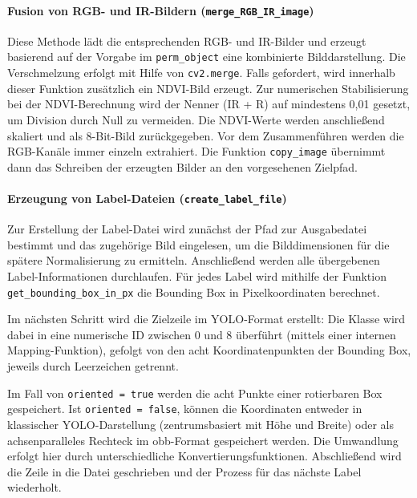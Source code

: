 \paragraph{Fusion von RGB- und IR-Bildern (\texttt{merge\_RGB\_IR\_image})}

Diese Methode lädt die entsprechenden \acrshort{RGB}- und \acrshort{IR}-Bilder und erzeugt basierend auf der Vorgabe im \texttt{perm\_object} eine kombinierte Bilddarstellung. Die Verschmelzung erfolgt mit Hilfe von \texttt{cv2.merge}. Falls gefordert, wird innerhalb dieser Funktion zusätzlich ein \acrshort{NDVI}-Bild erzeugt. Zur numerischen Stabilisierung bei der \acrshort{NDVI}-Berechnung wird der Nenner (\acrshort{IR} + \acrshort{R}) auf mindestens 0{,}01 gesetzt, um Division durch Null zu vermeiden. Die \acrshort{NDVI}-Werte werden anschließend skaliert und als 8-Bit-Bild zurückgegeben. Vor dem Zusammenführen werden die \acrshort{RGB}-Kanäle immer einzeln extrahiert. Die Funktion \texttt{copy\_image} übernimmt dann das Schreiben der erzeugten Bilder an den vorgesehenen Zielpfad.

\paragraph{Erzeugung von Label-Dateien (\texttt{create\_label\_file})}

Zur Erstellung der Label-Datei wird zunächst der Pfad zur Ausgabedatei bestimmt und das zugehörige Bild eingelesen, um die Bilddimensionen für die spätere Normalisierung zu ermitteln. Anschließend werden alle übergebenen Label-Informationen durchlaufen. Für jedes Label wird mithilfe der Funktion \texttt{get\_bounding\_box\_in\_px} die Bounding Box in Pixelkoordinaten berechnet.

Im nächsten Schritt wird die Zielzeile im \acrshort{YOLO}-Format erstellt: Die Klasse wird dabei in eine numerische \acrshort{ID} zwischen 0 und 8 überführt (mittels einer internen Mapping-Funktion), gefolgt von den acht Koordinatenpunkten der Bounding Box, jeweils durch Leerzeichen getrennt.

Im Fall von \texttt{oriented = true} werden die acht Punkte einer rotierbaren Box gespeichert. Ist \texttt{oriented = false}, können die Koordinaten entweder in klassischer \acrshort{YOLO}-Darstellung (zentrumsbasiert mit Höhe und Breite) oder als achsenparalleles Rechteck im \acrshort{obb}-Format gespeichert werden. Die Umwandlung erfolgt hier durch unterschiedliche Konvertierungsfunktionen. Abschließend wird die Zeile in die Datei geschrieben und der Prozess für das nächste Label wiederholt.

